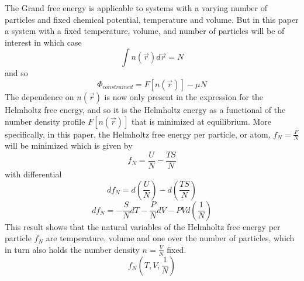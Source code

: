 \documentclass[double,12pt]{beavtex}
\begin{document}
The Grand free energy is applicable to systems with a varying number of 
particles and fixed chemical potential, temperature and volume. But in 
this paper a system with a fixed temperature, volume, and number of 
particles will be of interest in which case
\begin{equation}\int n(\vec r)d\vec{r}=N\end{equation}
and so 
\begin{equation}\label{GrandFE}\Phi_{constrained}= F[n(\vec r)]-\mu N\end{equation}
The dependence on $n(\vec r)$ is now only present in the expression for 
the Helmholtz free energy, and so it is the Helmholtz energy as a functional 
of the number density profile $F[n(\vec r)]$ that is minimized at equilibrium. 
More specifically, in this paper, the Helmholtz free energy per particle, 
or atom,  $f_N=\frac{F}{N}$ will be minimized which is given by
\begin{equation}f_N=\frac{U}{N}-\frac{TS}{N}\end{equation}
with differential
\begin{equation}\label{usetoshowmin}df_N=d\left(\frac{U}{N}\right)-d\left(\frac{TS}{N}\right)\end{equation}
\begin{equation}df_N=-\frac{S}{N}dT-\frac{P}{N}dV-PVd\left(\frac{1}{N}\right)\end{equation}
This result shows that the natural variables of the Helmholtz free energy 
per particle $f_N$ are temperature, volume and one over the number of 
particles, which in turn also holds the number density $n=\frac{V}{N}$ fixed. 
\begin{equation}f_N(T,V, \frac{1}{N})\end{equation}
 
\end{document}
